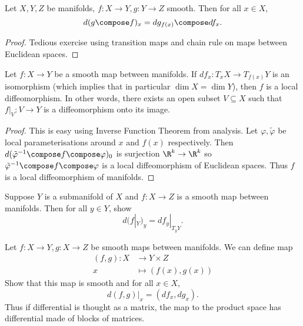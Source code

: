 \documentclass[a4paper]{article}
\begin{document}
\begin{proposition}
  Let \(X, Y, Z\) be manifolds, \(f: X \to Y, g: Y \to Z\) smooth. Then for all \(x \in X\),
  \[
    d(g \compose f)_x = dg_{f(x)} \compose df_x.
  \]
\end{proposition}

\begin{proof}
  Tedious exercise using transition maps and chain rule on maps between Euclidean spaces.
\end{proof}

\begin{theorem}
  Let \(f: X \to Y\) be a smooth map between manifolds. If \(df_x: T_xX \to T_{f(x)}Y\) is an isomorphism (which implies that in particular \(\dim X = \dim Y\)), then \(f\) is a local diffeomorphism. In other words, there exists an open subset \(V \subseteq X\) such that \(f|_V: V \to Y\) is a diffeomorphism onto its image.
\end{theorem}

\begin{proof}
  This is easy using Inverse Function Theorem from analysis. Let \(\varphi, \tilde \varphi\) be local parameterisations around \(x\) and \(f(x)\) respectively. Then \(d(\tilde \varphi^{-1} \compose f \compose \varphi)_0\) is surjection \(\R^k \to \R^k\) so \(\tilde \varphi^{-1} \compose f \compose \varphi\) is a local diffeomorphism of Euclidean spaces. Thus \(f\) is a local diffeomorphism of manifolds.
\end{proof}

\begin{ex}
  Suppose \(Y\) is a submanifold of \(X\) and \(f: X \to Z\) is a smooth map between manifolds. Then for all \(y \in Y\), show
  \[
    d(f|_Y)_y = df_y|_{T_yY}.
  \]
\end{ex}

\begin{ex}
  Let \(f: X \to Y, g: X \to Z\) be smooth maps between manifolds. We can define map
  \begin{align*}
    (f, g): X &\to Y \times Z \\
    x &\mapsto (f(x), g(x))
  \end{align*}
  Show that this map is smooth and for all \(x \in X\),
  \[
    d(f, g)|_x = (df_x, dg_x).
  \]
  Thus if differential is thought as a matrix, the map to the product space has differential made of blocks of matrices.
\end{ex}
\end{document}
